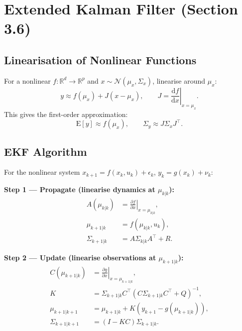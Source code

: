 \documentclass[12pt, a4paper]{article}
\begin{document}
\section{Extended Kalman Filter (Section 3.6)}

\subsection{Linearisation of Nonlinear Functions}

For a nonlinear $f:\mathbb{R}^d\to\mathbb{R}^p$ and $x\sim\mathcal{N}(\mu_x,\Sigma_x)$,
linearise around $\mu_x$:
\begin{equation}
  y \approx f(\mu_x) + J(x-\mu_x), \qquad J=\left.\frac{\mathrm{d}f}{\mathrm{d}x}\right|_{x=\mu_x}.
  \label{eq:taylor}
\end{equation}
This gives the first-order approximation:
\begin{equation}
  \mathrm{E}[y]\approx f(\mu_x), \qquad \Sigma_y\approx J\Sigma_x J^\top.
  \label{eq:EKF_propagation}
\end{equation}

\subsection{EKF Algorithm}

For the nonlinear system $x_{k+1}=f(x_k,u_k)+\epsilon_k$,
$y_k=g(x_k)+\nu_k$:

\textbf{Step 1 --- Propagate (linearise dynamics at $\mu_{k|k}$):}
\begin{align}
  A(\mu_{k|k}) &= \left.\frac{\partial f}{\partial x}\right|_{x=\mu_{k|k}}, \\
  \mu_{k+1|k} &= f(\mu_{k|k}, u_k), \\
  \Sigma_{k+1|k} &= A\Sigma_{k|k}A^\top + R.
\end{align}

\textbf{Step 2 --- Update (linearise observations at $\mu_{k+1|k}$):}
\begin{align}
  C(\mu_{k+1|k}) &= \left.\frac{\partial g}{\partial x}\right|_{x=\mu_{k+1|k}}, \\
  K &= \Sigma_{k+1|k}C^\top(C\Sigma_{k+1|k}C^\top+Q)^{-1}, \\
  \mu_{k+1|k+1} &= \mu_{k+1|k} + K\!\left(y_{k+1}-g(\mu_{k+1|k})\right), \\
  \Sigma_{k+1|k+1} &= (I-KC)\Sigma_{k+1|k}.
\end{align}
\end{document}
